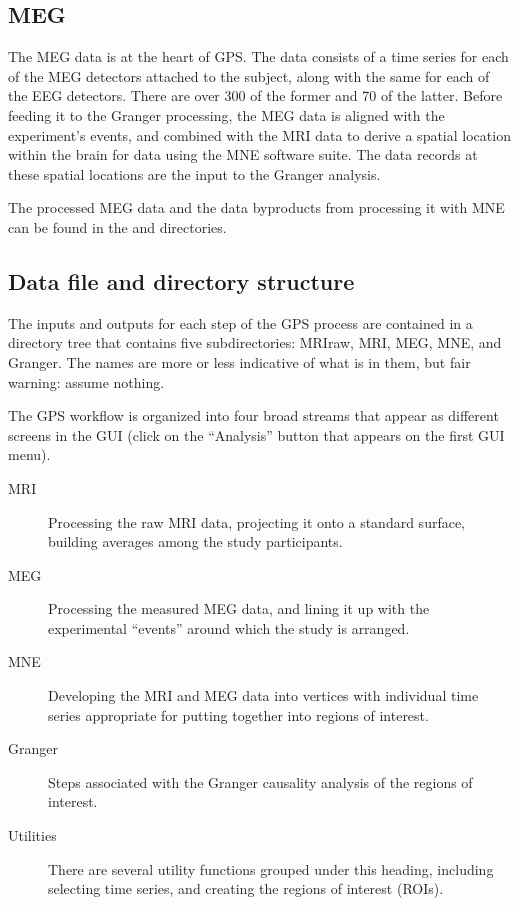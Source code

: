 \documentclass[11pt]{article}
\begin{document}
\subsection{MEG}

The MEG data is at the heart of GPS.  The data consists of a time
series for each of the MEG detectors attached to the subject, along
with the same for each of the EEG detectors.  There are over 300 of
the former and 70 of the latter.  Before feeding it to the Granger
processing, the MEG data is aligned with the experiment's events, and
combined with the MRI data to derive a spatial location within the
brain for data using the MNE software suite.  The data records at
these spatial locations are the input to the Granger analysis.

The processed MEG data and the data byproducts from processing it with
MNE can be found in the  and  directories.

\subsection{Data file and directory structure}

The inputs and outputs for each step of the GPS process are contained
in a directory tree that contains five subdirectories: MRIraw, MRI,
MEG, MNE, and Granger.  The names are more or less indicative of what
is in them, but fair warning: assume nothing.

The GPS workflow is organized into four broad streams that appear as
different screens in the GUI (click on the ``Analysis'' button that
appears on the first GUI menu).

\begin{description}

\item[MRI] Processing the raw MRI data, projecting it onto a standard
  surface, building averages among the study participants.

\item[MEG] Processing the measured MEG data, and lining it up with the
  experimental ``events'' around which the study is arranged.

\item[MNE] Developing the MRI and MEG data into vertices with
  individual time series appropriate for putting together into regions
  of interest.

\item[Granger] Steps associated with the Granger causality analysis of
  the regions of interest.

\item[Utilities] There are several utility functions grouped under
  this heading, including selecting time series, and creating the
  regions of interest (ROIs).

\end{description}
\end{document}

